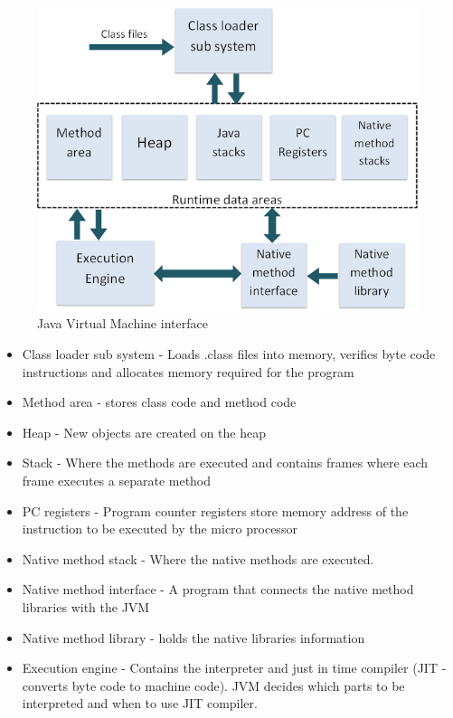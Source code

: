 \documentclass[interim_report.tex]{subfiles}
\begin{document}
\begin{figure}[H]
	\centering
	\includegraphics[width=\textwidth]{img/jvm.png}
	\caption{Java Virtual Machine interface \cite{jvm}}
	\label{fig:jvm}
\end{figure}

\begin{itemize}
	\item Class loader sub system - Loads .class files into memory, verifies byte code instructions and allocates memory required for the program
	\item Method area - stores class code and method code
	\item Heap - New objects are created on the heap
	\item Stack - Where the methods are executed and contains frames where each frame executes a separate method
	\item PC registers - Program counter registers store memory address of the instruction to be executed by the micro processor
	\item Native method stack - Where the native methods are executed.
	\item Native method interface - A program that connects the native method libraries with the JVM
	\item Native method library - holds the native libraries information
	\item Execution engine - Contains the interpreter and just in time compiler (JIT - converts byte code to machine code). JVM decides which parts to be interpreted and when to use JIT compiler.
\end{itemize}
\end{document}
